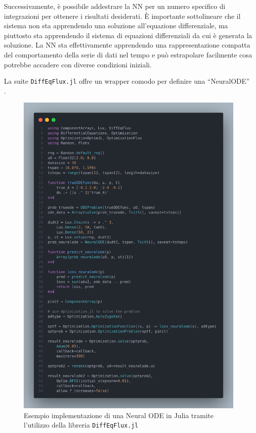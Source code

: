 Successivamente, è possibile addestrare la NN per un numero specifico di 
integrazioni per ottenere i risultati desiderati. È importante 
sottolineare che il sistema non sta apprendendo una soluzione 
all'equazione differenziale, ma piuttosto sta apprendendo il sistema di 
equazioni differenziali da cui è generata la soluzione. La NN sta 
effettivamente apprendendo una rappresentazione compatta del comportamento 
della serie di dati nel tempo e può estrapolare facilmente cosa 
potrebbe accadere con diverse condizioni iniziali. 

La suite \texttt{DiffEqFlux.jl} offre un wrapper comodo per definire una ``NeuralODE'' 
\cite{rackauckas2019diffeqflux}.

\begin{figure}[H]
    \begin{center}
        \includegraphics[scale=0.23]{img/neuralode.png}
        \caption{Esempio implementazione di una Neural ODE in Julia tramite l'utilizzo della libreria \texttt{DiffEqFlux.jl} \cite{rackauckas2019diffeqflux}}
        \label{fig:NN_Julia_example}
    \end{center}
\end{figure}

